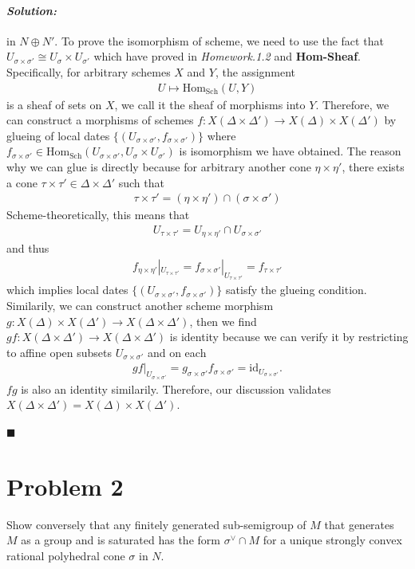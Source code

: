 \documentclass[12pt, a4paper]{article}
\newenvironment{solution}
  {\paragraph{\textit{Solution:}}\par\medskip}
  {\hfill$\blacksquare$\vspace{0.1cm}}
\begin{document}
\begin{solution}
in $N\oplus N'$. To prove the isomorphism of scheme, we need to use the fact that $U_{\sigma\times \sigma'}\cong U_{\sigma}\times U_{\sigma'}$ which have 
proved in \textit{Homework.1.2} and \textbf{Hom-Sheaf}. Specifically, for arbitrary schemes $X$ and $Y$, the assignment
\begin{align*}
    U \mapsto \text{Hom}_{\text{Sch}}(U,Y)
\end{align*}
is a sheaf of sets on $X$, we call it the sheaf of morphisms into $Y$. Therefore, we can construct a morphisms of schemes $f:X(\Delta\times \Delta')\to X(\Delta) \times X(\Delta')$
by glueing of local dates $\{(U_{\sigma\times\sigma'},f_{\sigma\times\sigma'})\}$ where $f_{\sigma\times\sigma'}\in \text{Hom}_{\text{Sch}}(U_{\sigma\times\sigma'},U_\sigma\times U_{\sigma'})$ is 
isomorphism we have obtained. The reason why we can glue is directly because for arbitrary another cone $\eta\times\eta'$,
there exists a cone $\tau\times\tau'\in \Delta\times\Delta'$ such that 
\begin{align*}
    \tau\times\tau' = (\eta\times\eta')\cap (\sigma\times\sigma')
\end{align*}
Scheme-theoretically, this means that
\begin{align*}
    U_{\tau\times\tau'} = U_{\eta\times\eta'} \cap U_{\sigma\times\sigma'}
\end{align*}
and thus 
\begin{align*}
    f_{\eta\times\eta'}|_{U_{\tau\times\tau'}} = f_{\sigma\times\sigma'}|_{U_{\tau\times\tau'}} = f_{\tau\times\tau'}
\end{align*}
which implies local dates $\{(U_{\sigma\times\sigma'},f_{\sigma\times\sigma'})\}$ satisfy the glueing condition. Similarily, we can construct another scheme morphism $g:X(\Delta) \times X(\Delta')\to X(\Delta \times \Delta')$, then we find 
$gf:X(\Delta \times \Delta')\to X(\Delta \times \Delta')$ is identity because we can verify it by restricting to affine open subsets $U_{\sigma\times\sigma'}$ and on each 
\begin{align*}
    gf|_{U_{\sigma\times\sigma'}} = g_{\sigma\times\sigma'}f_{\sigma\times\sigma'}= \text{id}_{U_{\sigma\times\sigma'}}.
\end{align*}
$fg$ is also an identity similarily. Therefore, our discussion validates $X(\Delta \times \Delta') = X(\Delta) \times X(\Delta')$.

\end{solution}

\section*{Problem 2}
Show conversely that any finitely generated sub-semigroup of $M$ that generates $M$ as a group and is saturated has the form $\sigma^\vee \cap M$ for a unique strongly convex rational polyhedral cone $\sigma$ in $N$.
\end{document}
